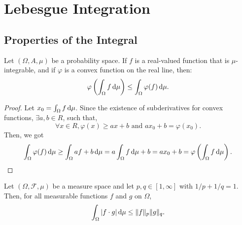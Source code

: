 \chapter{Lebesgue Integration}

\section{Properties of the Integral}

\begin{theorem}
	Let $(\Omega,A,\mu)$ be a probability space. If $f$ is a real-valued function that is $\mu$-integrable, and if $\varphi$ is a convex function on the real line, then:
	\begin{equation}
		\varphi\left(\int_{\Omega}f\mathop{}\!\mathrm{d}\mu\right)\leq\int_{\Omega}\varphi(f)\mathop{}\!\mathrm{d}\mu.
	\end{equation}
\end{theorem}

\begin{proof}
	Let $x_{0}=\int_{\Omega}f\mathop{}\!\mathrm{d}\mu$. Since the existence of subderivatives for convex functions, $\exists a,b\in R$, such that,
	\begin{equation*}
		\forall x\in R,\varphi(x)\geq ax+b\text{ and }ax_0+b=\varphi(x_0).
	\end{equation*}
	Then, we got
	\begin{equation*}
		\int_{\Omega}\varphi(f)\mathop{}\!\mathrm{d}\mu\geq\int_{\Omega}af+b\mathop{}\!\mathrm{d}\mu=a\int_{\Omega}f\mathop{}\!\mathrm{d}\mu+b=ax_0+b=\varphi\left(\int_{\Omega}f\mathop{}\!\mathrm{d}\mu\right).
	\end{equation*}
\end{proof}

\begin{theorem} \label{thm:holder-inequality}
	Let $(\Omega,\mathcal{F},\mu)$ be a measure space and let $p,q\in[1,\infty]$ with $1/p+1/q=1$. Then, for all measurable functions $f$ and $g$ on $\Omega$,
	\begin{equation}
		\int_{\Omega}|f\cdot g|\mathop{}\!\mathrm{d}\mu\leq\|f\|_{p}\|g\|_{q}.
	\end{equation}
\end{theorem}

